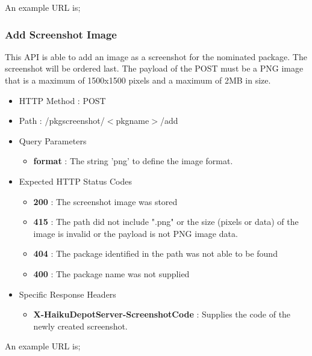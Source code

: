 An example URL is;


\subsubsection{Add Screenshot Image}

This API is able to add an image as a screenshot for the nominated package.  The screenshot will be ordered last.  The payload of the POST must be a PNG image that is a maximum of 1500x1500 pixels and a maximum of 2MB in size.

\begin{itemize}
\item HTTP Method : POST
\item Path : /pkgscreenshot/$<$pkgname$>$/add
\item Query Parameters
  \begin{itemize}
  \item {\bf format} : The string 'png' to define the image format.
  \end{itemize}
\item Expected HTTP Status Codes
  \begin{itemize}
  \item {\bf 200} : The screenshot image was stored
  \item {\bf 415} : The path did not include ".png" or the size (pixels or data) of the image is invalid or the payload is not PNG image data.
  \item {\bf 404} : The package identified in the path was not able to be found
  \item {\bf 400} : The package name was not supplied
  \end{itemize}
\item Specific Response Headers
  \begin{itemize}
  \item {\bf X-HaikuDepotServer-ScreenshotCode} : Supplies the code of the newly created screenshot.
  \end{itemize}
\end{itemize}

An example URL is;






